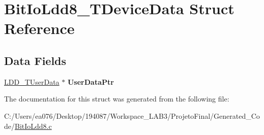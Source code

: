 \hypertarget{struct_bit_io_ldd8___t_device_data}{\section{Bit\-Io\-Ldd8\-\_\-\-T\-Device\-Data Struct Reference}
\label{struct_bit_io_ldd8___t_device_data}
}
\subsection*{Data Fields}
\begin{DoxyCompactItemize}
\item 
\hypertarget{struct_bit_io_ldd8___t_device_data_acf97aed7bb6cc3bd6e9de67e0fbcca74}{\hyperlink{group___p_e___types__module_ga0b66a73f87238a782318aa0be7578e35}{L\-D\-D\-\_\-\-T\-User\-Data} $\ast$ {\bfseries User\-Data\-Ptr}}\label{struct_bit_io_ldd8___t_device_data_acf97aed7bb6cc3bd6e9de67e0fbcca74}

\end{DoxyCompactItemize}


The documentation for this struct was generated from the following file\-:\begin{DoxyCompactItemize}
\item 
C\-:/\-Users/ea076/\-Desktop/194087/\-Workspace\-\_\-\-L\-A\-B3/\-Projeto\-Final/\-Generated\-\_\-\-Code/\hyperlink{_bit_io_ldd8_8c}{Bit\-Io\-Ldd8.\-c}\end{DoxyCompactItemize}
